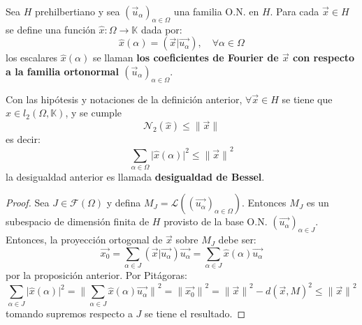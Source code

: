 \documentclass[12pt]{report}
\theoremstyle{largebreak}
\newcommand\cf[3]{\ensuremath{#1:#2\rightarrow#3}}
\newcommand\abs[1]{\ensuremath{\big|#1\big|}}
\newcommand\norm[1]{\ensuremath{\|#1\|}}
\newcommand\pint[2]{\ensuremath{\left(#1\big| #2\right)}}
\begin{document}
    \begin{mydef}
        Sea $H$ prehilbertiano y sea $(\vec{u}_\alpha)_{\alpha\in\Omega}$ una familia O.N. en $H$. Para cada $\vec{x}\in H$ se define una función $\cf{\hat{x}}{\Omega}{\mathbb{K}}$ dada por:
        \begin{equation*}
            \hat{x}(\alpha)=\pint{\vec{x}}{\vec{u_\alpha}},\quad\forall\alpha\in\Omega
        \end{equation*}
        los escalares $\hat{x}(\alpha)$ se llaman \textbf{los coeficientes de Fourier de $\vec{x}$ con respecto a la familia ortonormal $(\vec{u}_\alpha)_{\alpha\in\Omega}$}.
    \end{mydef}

    \begin{theor}
        Con las hipótesis y notaciones de la definición anterior, $\forall\vec{x}\in H$ se tiene que $\hat{x}\in l_2(\Omega,\mathbb{K})$, y se cumple
        \begin{equation*}
            \mathcal{N}_2(\hat{x})\leq\norm{\vec{x}}
        \end{equation*}
        es decir:
        \begin{equation*}
            \sum_{\alpha\in\Omega}\abs{\hat{x}(\alpha)}^2\leq\norm{\vec{x}}^2
        \end{equation*}
        la desigualdad anterior es llamada \textbf{desigualdad de Bessel}.
    \end{theor}

    \begin{proof}
        Sea $J\in\mathcal{F}(\Omega)$ y defina $M_J=\mathcal{L}((\vec{u_\alpha})_{\alpha\in\Omega})$. Entonces $M_J$ es un subespacio de dimensión finita de $H$ provisto de la base O.N. $(\vec{u_\alpha})_{\alpha\in J}$. Entonces, la proyección ortogonal de $\vec{x}$ sobre $M_J$ debe ser:
        \begin{equation*}
            \vec{x_0}=\sum_{\alpha\in J }\pint{\vec{x}}{\vec{u_\alpha}}\vec{u_\alpha}=\sum_{\alpha\in J }\hat{x}(\alpha)\vec{u_\alpha}
        \end{equation*}
        por la proposición anterior. Por Pitágoras:
        \begin{equation*}
            \sum_{\alpha\in J}\abs{\hat{x}(\alpha)}^2=\norm{\sum_{\alpha\in J}\hat{x}(\alpha)\vec{u_\alpha}}^2=\norm{\vec{x_0}}^2=\norm{\vec{x}}^2-d(\vec{x},M)^2\leq\norm{\vec{x}}^2
        \end{equation*}
        tomando supremos respecto a $J$ se tiene el resultado.
    \end{proof}
\end{document}
